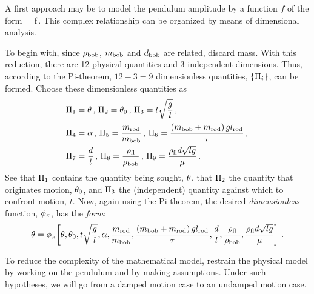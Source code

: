 A first approach may be to model the pendulum amplitude by a function $f$ of the form
\beq
\angpos = f\,.
\eeq
This complex relationship can be organized by means of dimensional analysis. 

To begin with, since $\rho_\text{bob}$, $m_\text{bob}$ and $d_\text{bob}$ are related, discard mass. With this reduction, there are 12 physical quantities and 3 independent dimensions. Thus, according to the Pi-theorem, $12 - 3 = 9$ dimensionless quantities, $\left\lbrace{\Pi_i}\right\rbrace$, can be formed. Choose these dimensionless quantities as
\begin{align*}
&\Pi_1 = \theta\,,\,
 \Pi_2 = \theta_0\,,\,
 \Pi_3 = t\sqrt{\dfrac{g}{l}}\,,\,\\
&\Pi_4 = \alpha\,,\,
 \Pi_5 = \dfrac{m_\text{rod}}{m_\text{bob}}\,,\,
 \Pi_6 = \dfrac{\left(m_\text{bob} + m_\text{rod}\right)gl_\text{rod}}{\tau}\,,\,\\
&\Pi_7 = \dfrac{d}{l}\,,\,
 \Pi_8 = \dfrac{\rho_\text{fl}}{\rho_\text{bob}}\,,\,
 \Pi_9 = \dfrac{\rho_\text{fl}d\sqrt{lg}}{\mu}\,.
\end{align*}
See that $\Pi_1$ contains the quantity being sought, $\theta$, that $\Pi_2$ the quantity that originates motion, $\theta_0$, and $\Pi_3$ the (independent) quantity against which to confront motion, $t$. Now, again using the Pi-theorem, the desired \emph{dimensionless} function, $\phi_{\pi}$, has the \emph{form}:
\begin{equation}\label{eq:fullgravpendulummodel}
\theta = \phi_{\pi}\!\left[{
            \theta,
            \theta_0,
            t\sqrt{\dfrac{g}{l}},
            \alpha,
            \dfrac{m_\text{rod}}{m_\text{bob}},
            \dfrac{\left(m_\text{bob} + m_\text{rod}\right)gl_\text{rod}}{\tau},
            \dfrac{d}{l},
            \dfrac{\rho_\text{fl}}{\rho_\text{bob}},
            \dfrac{\rho_\text{fl}d\sqrt{lg}}{\mu}
            }\right]\,.
\end{equation}

To reduce the complexity of the mathematical model, restrain the physical model by working on the pendulum and by making assumptions. Under such hypotheses, we will go from a damped motion case to an undamped motion case.


